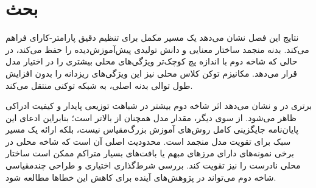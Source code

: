 \section{بحث}
نتایج این فصل نشان می‌دهد  یک مسیر مکمل برای تنظیم دقیق پارامتر-کارای  فراهم می‌کند. بدنه منجمد  ساختار معنایی و دانش تولیدی پیش‌آموزش‌دیده را حفظ می‌کند، در حالی که شاخه دوم با اندازه پچ کوچک‌تر ویژگی‌های محلی بیشتری را در اختیار مدل قرار می‌دهد. مکانیزم توکن کلاس محلی نیز این ویژگی‌های ریزدانه را بدون افزایش طول توالی بدنه اصلی، به شبکه توکنی  منتقل می‌کند.

برتری  در  و  نشان می‌دهد اثر شاخه دوم بیشتر در شباهت توزیعی پایدار و کیفیت ادراکی ظاهر می‌شود. از سوی دیگر، مقدار  مدل همچنان از  بالاتر است؛ بنابراین ادعای این پایان‌نامه جایگزینی کامل روش‌های آموزش بزرگ‌مقیاس نیست، بلکه ارائه یک مسیر سبک برای تقویت مدل منجمد است. محدودیت اصلی آن است که شاخه محلی در برخی نمونه‌های دارای مرزهای مبهم یا بافت‌های بسیار متراکم ممکن است ساختار محلی نادرست را نیز تقویت کند. بررسی شرط‌گذاری اختیاری  و طراحی چندمقیاسی شاخه دوم می‌تواند در پژوهش‌های آینده برای کاهش این خطاها مطالعه شود.
